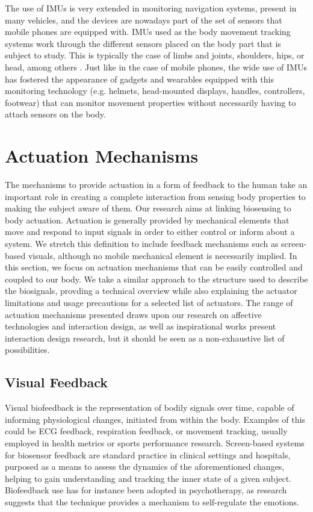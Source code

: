The use of IMUs is very extended in monitoring navigation systems, present in many vehicles, and the devices are nowadays part of the set of sensors that mobile phones are equipped with. IMUs used as the body movement tracking systems work through the different sensors placed on the body part that is subject to study. This is typically the case of limbs and joints, shoulders, hips, or head, among others \cite{niswander_optimization_2020}. Just like in the case of mobile phones, the wide use of IMUs has fostered the appearance of gadgets and wearables equipped with this monitoring technology (e.g. helmets, head-mounted displays, handles, controllers, footwear) that can monitor movement properties without necessarily having to attach sensors on the body.

\section{Actuation Mechanisms}

The mechanisms to provide actuation in a form of feedback to the human take an important role in creating a complete interaction from sensing body properties to making the subject aware of them. Our research aims at linking biosensing to body actuation. Actuation is generally provided by mechanical elements that move and respond to input signals in order to either control or inform about a system. We stretch this definition to include feedback mechanisms such as screen-based visuals, although no mobile mechanical element is necessarily implied. In this section, we focus on actuation mechanisms that can be easily controlled and coupled to our body. We take a similar approach to the structure used to describe the biosignals, provding a technical overview while also explaining the actuator limitations and usage precautions for a selected list of actuators. The range of actuation mechanisms presented draws upon our research on affective technologies and interaction design, as well as inspirational works present interaction design research, but it should be seen as a non-exhaustive list of possibilities.

\subsection*{Visual Feedback}

Visual biofeedback is the representation of bodily signals over time, capable of informing physiological changes, initiated from within the body. Examples of this could be ECG feedback, respiration feedback, or movement tracking, usually employed in health metrics or sports performance research. Screen-based systems for biosensor feedback are standard practice in clinical settings and hospitals, purposed as a means to assess the dynamics of the aforementioned changes, helping to gain understanding and tracking the inner state of a given subject. Biofeedback use has for instance been adopted in psychotherapy, as research suggests that the technique provides a mechanism to self-regulate the emotions.


